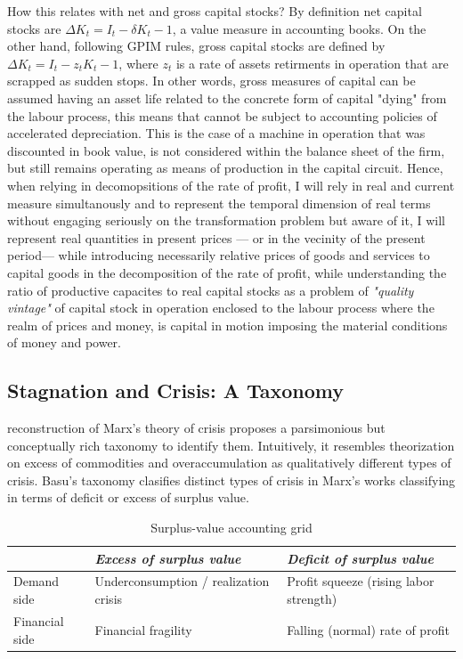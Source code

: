 \documentclass[11pt,a4paper]{article}
\begin{document}
{How this relates with net and gross capital stocks? By definition net capital stocks are $\Delta K_t = I_t- \delta K_t-1$, a value measure in accounting books. On the 
other hand, following  \citet{Shaikh2016} GPIM rules, gross capital stocks are defined by $\Delta K_t = I_t- z_t K_t-1$, where $ z_t $ is a rate of assets retirments
in operation that are scrapped as sudden stops. In other words, gross measures of capital can be assumed having an asset life related to the concrete form of capital "dying"
from the labour process, this means that cannot be subject to accounting policies of accelerated depreciation.  This is the case of a machine in operation that was discounted in book value, is not considered within the balance sheet of the firm, but still remains operating as means of production in the capital circuit. Hence, when relying in decomopsitions of the rate of profit, I will rely in real and current measure simultanously and to represent the temporal dimension of real terms without engaging seriously on the transformation problem but aware of it, I will represent real quantities in present prices --- or in the vecinity of the present period--- while introducing necessarily relative prices of goods and services to capital goods in the decomposition of the rate of profit, while understanding the ratio of productive capacites to real capital stocks as a problem of \textit{"quality vintage"} of capital stock in operation enclosed to the labour process where the realm of prices and money, is capital in motion imposing the material conditions of money and power. 



\subsection{Stagnation and Crisis: A Taxonomy}
\label{subsec:typology}

\citet{Basu2019} reconstruction of Marx's theory of crisis proposes a parsimonious but conceptually rich taxonomy to identify them. Intuitively, it resembles \citet{Itoh1978} theorization on excess of commodities and overaccumulation as qualitatively different types of crisis. Basu's taxonomy clasifies distinct types of crisis in Marx's works classifying in terms of deficit or excess of surplus value. 


\begin{table}[htbp]
	\centering
	\caption{Surplus-value accounting grid}
	\label{tab:basu_grid}
	{\small
		\begin{tabular}{lll}
			\toprule
			& \textit{Excess of surplus value} 
			& \textit{Deficit of surplus value} \\
			\midrule
			Demand side    & Underconsumption / realization crisis 
			& Profit squeeze (rising labor strength) \\
			Financial side & Financial fragility                   
			& Falling (normal) rate of profit \\
			\bottomrule
	\end{tabular}}
\end{table}

}
\end{document}
